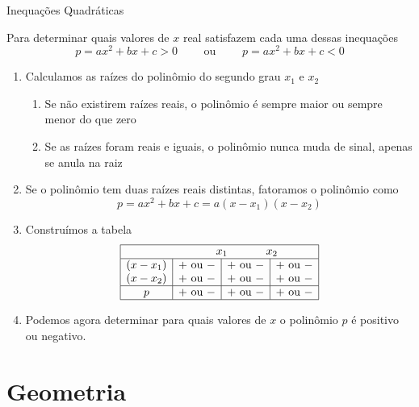 \begin{teoria}{Inequações Quadráticas}
    
    Para determinar quais valores de $x$ real satisfazem cada uma dessas inequações
    \[ p = ax^2 + bx + c > 0  \qquad \text{ ou }\qquad  p = ax^2 + bx + c < 0  \]
    \begin{enumerate}
        \item Calculamos as raízes do polinômio do segundo grau $x_1$ e $x_2$
        \begin{enumerate}
            \item Se não existirem raízes reais, o polinômio é sempre maior ou sempre menor do que zero
            \item Se as raízes foram reais e iguais, o polinômio nunca muda de sinal, apenas se anula na raiz
        \end{enumerate}
        \item Se o polinômio tem duas raízes reais distintas, fatoramos o polinômio como 
            \[ p = ax^2 + bx + c = a(x-x_1)(x-x_2)\]
        \item Construímos a tabela 
            \[\begin{array}{|c|c|c|c|} \hline
            	\multicolumn{4}{|l|}{\hspace{28mm} x_1 \hspace{12mm} x_2}      \\ \hline
                (x-x_1) & + \text{ ou } -  & + \text{ ou } - & + \text{ ou } - \\
                (x-x_2) & + \text{ ou } -  & + \text{ ou } - & + \text{ ou } - \\ \hline
                   p    & + \text{ ou } -  & + \text{ ou } - & + \text{ ou } - \\ \hline
            \end{array} 
            \]
        \item Podemos agora determinar para quais valores de $x$ o polinômio $p$ é positivo ou negativo.
    \end{enumerate}
    
\end{teoria}

\section{Geometria}

